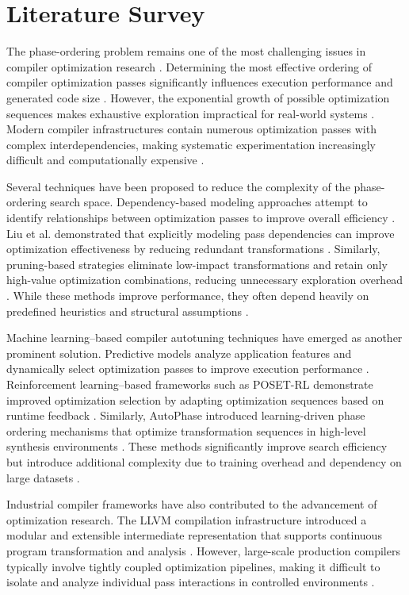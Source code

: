\documentclass[conference]{IEEEtran}
\begin{document}

\section{Literature Survey}

The phase-ordering problem remains one of the most challenging issues in compiler optimization research \cite{ref1}. Determining the most effective ordering of compiler optimization passes significantly influences execution performance and generated code size \cite{ref2}. However, the exponential growth of possible optimization sequences makes exhaustive exploration impractical for real-world systems \cite{ref19}. Modern compiler infrastructures contain numerous optimization passes with complex interdependencies, making systematic experimentation increasingly difficult and computationally expensive \cite{ref1}.

Several techniques have been proposed to reduce the complexity of the phase-ordering search space. Dependency-based modeling approaches attempt to identify relationships between optimization passes to improve overall efficiency \cite{ref1}. Liu et al. demonstrated that explicitly modeling pass dependencies can improve optimization effectiveness by reducing redundant transformations \cite{ref1}. Similarly, pruning-based strategies eliminate low-impact transformations and retain only high-value optimization combinations, reducing unnecessary exploration overhead \cite{ref4}. While these methods improve performance, they often depend heavily on predefined heuristics and structural assumptions \cite{ref19}.

Machine learning–based compiler autotuning techniques have emerged as another prominent solution. Predictive models analyze application features and dynamically select optimization passes to improve execution performance \cite{ref8}. Reinforcement learning–based frameworks such as POSET-RL demonstrate improved optimization selection by adapting optimization sequences based on runtime feedback \cite{ref8}. Similarly, AutoPhase introduced learning-driven phase ordering mechanisms that optimize transformation sequences in high-level synthesis environments \cite{ref12}. These methods significantly improve search efficiency but introduce additional complexity due to training overhead and dependency on large datasets \cite{ref12}.

Industrial compiler frameworks have also contributed to the advancement of optimization research. The LLVM compilation infrastructure introduced a modular and extensible intermediate representation that supports continuous program transformation and analysis \cite{ref16}. However, large-scale production compilers typically involve tightly coupled optimization pipelines, making it difficult to isolate and analyze individual pass interactions in controlled environments \cite{ref16}.
\end{document}
